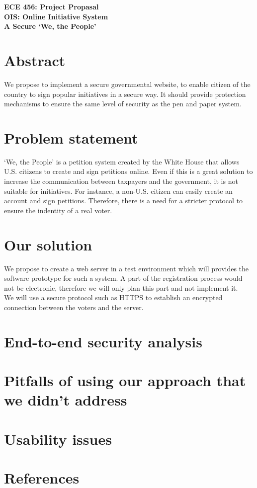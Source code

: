 \documentclass[12pt,letter,titlepage]{article}
\title{\mytitle}
\author{Bastien Jacot-Guillarmod}
\begin{document}
\begin{center}
  {\bf \Large 
    ECE 456: Project Propasal\\
    OIS: Online Initiative System\\
    A Secure `We, the People'
  }
\end{center}

\section{Abstract}
We propose to implement a secure governmental website, to enable citizen of the country to sign popular initiatives in a secure way. It should provide protection mechanisms to ensure the same level of security as the pen and paper system.
\section{Problem statement}
`We, the People' is a petition system created by the White House that allows U.S. citizens to create and sign petitions online. Even if this is a great solution to increase the communication between taxpayers and the government, it is not suitable for initiatives. For instance, a non-U.S. citizen can easily create an account and sign petitions. Therefore, there is a need for a stricter protocol to ensure the indentity of a real voter.
\section{Our solution}
We propose to create a web server in a test environment which will provides the software prototype for such a system. A part of the registration process would not be electronic, therefore we will only plan this part and not implement it.\\
We will use a secure protocol such as HTTPS to establish an encrypted connection between the voters and the server.

\section{End-to-end security analysis}
\section{Pitfalls of using our approach that we didn't address}
\section{Usability issues}
\section{References}

 
\end{document}
